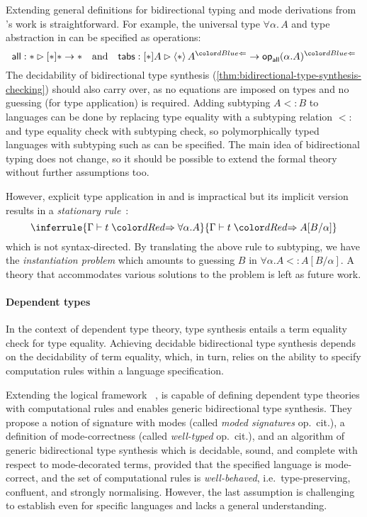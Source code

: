 Extending general definitions for bidirectional typing and mode derivations from \citeauthor{Hamana2011}'s work is straightforward. 
For example, the universal type $\forall \alpha.\, A$ and type abstraction in \SystemF can be specified as operations:
\[
\mathsf{all} : * \rhd [*] * \to *
\quad\text{and}\quad
\mathsf{tabs} : [*] A \rhd \left< * \right> A^{\chk} \to \tyOp_{\mathsf{all}}(\alpha. A)^{\chk}
\]
The decidability of bidirectional type synthesis (\cref{thm:bidirectional-type-synthesis-checking}) should also carry over, as no equations are imposed on types and no guessing (for type application) is required.
Adding subtyping $A \mathrel{<:} B$ to languages can be done by replacing type equality with a subtyping relation $\mathrel{<:}$ and type equality check with subtyping check, so polymorphically typed languages with subtyping such as \SystemFsub can be specified.
The main idea of bidirectional typing does not change, so it should be possible to extend the formal theory without further assumptions too.

However, explicit type application in \SystemF and \SystemFsub is impractical but its implicit version results in a \emph{stationary rule}~\cite{Leivant1986}:
\[
  \inferrule{\Gamma \vdash t \syn \forall \alpha. A}{\Gamma \vdash t \syn A[B/\alpha]}
\]
which is not syntax-directed.
By translating the above rule to subtyping, we have the \emph{instantiation problem} which amounts to guessing $B$ in $\forall \alpha. A <: A[B/\alpha]$.
A theory that accommodates various solutions to the problem is left as future work.

\paragraph{Dependent types}
In the context of dependent type theory, type synthesis entails a term equality check for type equality.
Achieving decidable bidirectional type synthesis depends on the decidability of term equality, which, in turn, relies on the ability to specify computation rules within a language specification.

Extending the logical framework \Dedukti~\cite{Assaf2016},  is capable of defining dependent type theories with computational rules and enables generic bidirectional type synthesis.
They propose a notion of \LF signature with modes (called \emph{moded signatures} op.\ cit.), a definition of mode-correctness (called \emph{well-typed} op.\ cit.), and an algorithm of generic bidirectional type synthesis which is decidable, sound, and complete with respect to mode-decorated terms, provided that the specified language is mode-correct, and the set of computational rules is \emph{well-behaved}, i.e.\ type-preserving, confluent, and strongly normalising.
However, the last assumption is challenging to establish even for specific languages and lacks a general understanding.

